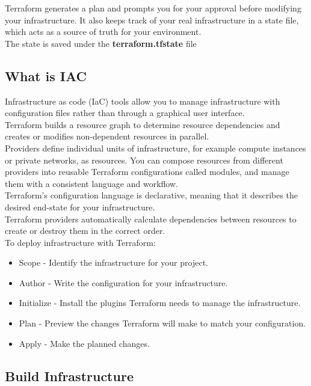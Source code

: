 \documentclass[12pt, letterpaper, twoside]{article}
\begin{document}
Terraform generates a plan and prompts you for your approval before modifying your infrastructure. 
It also keeps track of your real infrastructure in a state file, which acts as a source of 
truth for your environment.\\
The state is saved under the \textbf{terraform.tfstate} file 

\subsection{What is IAC}

Infrastructure as code (IaC) tools allow you to manage infrastructure with configuration 
files rather than through a graphical user interface.\\
Terraform builds a resource graph to determine resource dependencies and creates or 
modifies non-dependent resources in parallel.\\

Providers define individual units of infrastructure, for example compute instances or private networks, 
as resources. You can compose resources from different providers into reusable Terraform 
configurations called modules, and manage them with a consistent language and workflow.\\

Terraform's configuration language is declarative, meaning that it describes the desired 
end-state for your infrastructure.\\
Terraform providers automatically calculate dependencies between resources to create or 
destroy them in the correct order.\\

To deploy infrastructure with Terraform:
\begin{itemize}
    \item Scope - Identify the infrastructure for your project.
    \item Author - Write the configuration for your infrastructure.
    \item Initialize - Install the plugins Terraform needs to manage the infrastructure.
    \item Plan - Preview the changes Terraform will make to match your configuration.
    \item Apply - Make the planned changes.
\end{itemize}

\subsection{Build Infrastructure}
\end{document}
